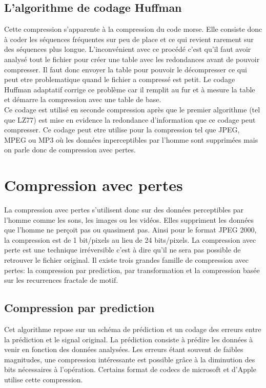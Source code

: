 \documentclass[a4paper]{report}
\begin{document}
	\subsection{L'algorithme de codage Huffman}
		Cette compression s'apparente à la compression du code morse. Elle consiste donc à coder les séquences fréquentes sur peu de place et ce qui revient rarement sur des séquences plus longue. L'inconvénient avec ce procédé c'est qu'il faut avoir analysé tout le fichier pour créer une table avec les redondances avant de pouvoir compresser. Il faut donc envoyer la table pour pouvoir le décompresser ce qui peut etre problematique quand le fichier a compressé est petit. Le codage Huffman adaptatif corrige ce problème car il remplit au fur et à mesure la table et démarre la compression avec une table de base. \\
	Ce codage est utilisé en seconde compression après que le premier algorithme (tel que LZ77) est mise en evidence la redondance d'information que ce codage peut compresser. Ce codage peut etre utilise pour la compression tel que JPEG, MPEG ou MP3 où les données inperceptibles par l'homme sont supprimées mais on parle donc de compression avec pertes.
	\section{Compression avec pertes}
		La compression avec pertes s'utilisent donc sur des données perceptibles par l'homme comme les sons, les images ou les vidéos. Elles suppriment les données que l'homme ne perçoit pas ou quasiment pas. Ainsi pour le format JPEG 2000, la compression est de 1 bit/pixels au lieu de 24 bits/pixels. La compression avec perte est une technique irréversible c'est à dire qu'il ne sera pas possible de retrouver le fichier original. Il existe trois grandes famille de compression avec pertes: la compression par prediction, par transformation et la compression basée sur les recurrences fractale de motif.
	\subsection{Compression par prediction}
		Cet algorithme repose sur un schéma de prédiction et un codage des erreurs entre la prédiction et le signal original. La prédiction consiste à prédire les données à venir en fonction des données analysées. Les erreurs étant souvent de faibles magnitudes, une compression intéressante est possible grâce à la diminution des bits nécessaires à l’opération. Certains format de codecs de microsoft et d'Apple utilise cette compression.
\end{document}

